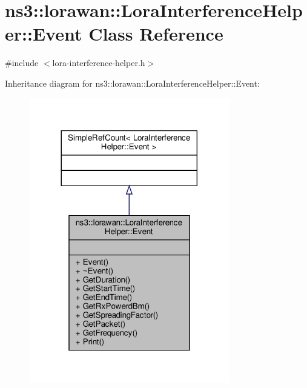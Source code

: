\hypertarget{classns3_1_1lorawan_1_1LoraInterferenceHelper_1_1Event}{}\section{ns3\+:\+:lorawan\+:\+:Lora\+Interference\+Helper\+:\+:Event Class Reference}
\label{classns3_1_1lorawan_1_1LoraInterferenceHelper_1_1Event}


{\ttfamily \#include $<$lora-\/interference-\/helper.\+h$>$}



Inheritance diagram for ns3\+:\+:lorawan\+:\+:Lora\+Interference\+Helper\+:\+:Event\+:
\nopagebreak
\begin{figure}[H]
\begin{center}
\leavevmode
\includegraphics[width=248pt]{classns3_1_1lorawan_1_1LoraInterferenceHelper_1_1Event__inherit__graph}
\end{center}
\end{figure}


